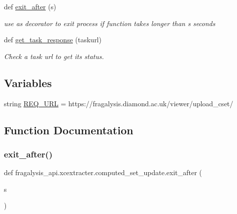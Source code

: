 \begin{DoxyCompactItemize}
def \hyperlink{namespacefragalysis__api_1_1xcextracter_1_1computed__set__update_ab6ecfd5eeae5a05ee20fa0d19c798f48}{exit\+\_\+after} (s)
\begin{DoxyCompactList}\small\item\em use as decorator to exit process if function takes longer than s seconds \end{DoxyCompactList}\item 
def \hyperlink{namespacefragalysis__api_1_1xcextracter_1_1computed__set__update_a5065036bae4e3eea5df321d366767d29}{get\+\_\+task\+\_\+response} (taskurl)
\begin{DoxyCompactList}\small\item\em Check a task url to get it\textquotesingle{}s status. \end{DoxyCompactList}\end{DoxyCompactItemize}
\subsection*{Variables}
\begin{DoxyCompactItemize}
\item 
string \hyperlink{namespacefragalysis__api_1_1xcextracter_1_1computed__set__update_adefba58b79837d4e7133a92963544f3f}{R\+E\+Q\+\_\+\+U\+RL} = \textquotesingle{}https\+://fragalysis.\+diamond.\+ac.\+uk/viewer/upload\+\_\+cset/\textquotesingle{}
\end{DoxyCompactItemize}


\subsection{Function Documentation}
\mbox{\label{namespacefragalysis__api_1_1xcextracter_1_1computed__set__update_ab6ecfd5eeae5a05ee20fa0d19c798f48}} 
\subsubsection{\texorpdfstring{exit\+\_\+after()}{exit\_after()}}
{\footnotesize\ttfamily def fragalysis\+\_\+api.\+xcextracter.\+computed\+\_\+set\+\_\+update.\+exit\+\_\+after (\begin{DoxyParamCaption}\item[{}]{s }\end{DoxyParamCaption})}



